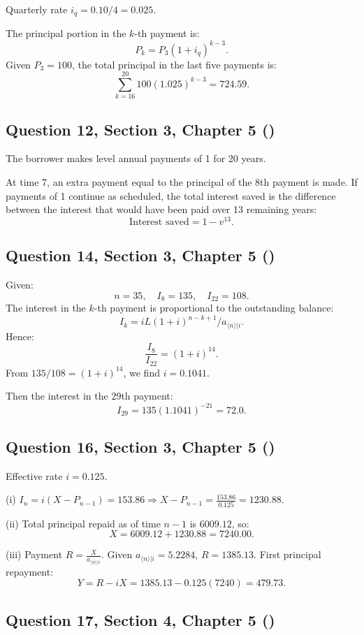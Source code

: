 \documentclass[12pt, a4paper]{article}
\newcommand{\angl}[1]{\langle #1 \rangle}
\begin{document}
Quarterly rate \( i_q = 0.10 / 4 = 0.025. \)

The principal portion in the \(k\)-th payment is:
\[
P_k = P_3 (1 + i_q)^{k-3}.
\]
Given \( P_3 = 100 \), the total principal in the last five payments is:
\[
\sum_{k=16}^{20} 100(1.025)^{k-3} = 724.59.
\]

\subsection*{Question 12, Section 3, Chapter 5  (\cite{toi3rd})}

The borrower makes level annual payments of 1 for 20 years.

At time 7, an extra payment equal to the principal of the 8th payment is made.  
If payments of 1 continue as scheduled, the total interest saved is the difference between the interest that would have been paid over 13 remaining years:
\[
\text{Interest saved} = 1 - v^{13}.
\]

\subsection*{Question 14, Section 3, Chapter 5  (\cite{toi3rd})}

Given:
\[
n = 35, \quad I_8 = 135, \quad I_{22} = 108.
\]
The interest in the \(k\)-th payment is proportional to the outstanding balance:
\[
I_k = i L (1 + i)^{n - k + 1} / a_{\angl{n}|i}.
\]
Hence:
\[
\frac{I_8}{I_{22}} = (1 + i)^{14}.
\]
From \(135 / 108 = (1 + i)^{14}\), we find \(i = 0.1041.\)

Then the interest in the 29th payment:
\[
I_{29} = 135(1.1041)^{-21} = 72.0.
\]

\subsection*{Question 16, Section 3, Chapter 5  (\cite{toi3rd})}

Effective rate \( i = 0.125 \).

(i) \( I_n = i(X - P_{n-1}) = 153.86 \Rightarrow X - P_{n-1} = \frac{153.86}{0.125} = 1230.88. \)

(ii) Total principal repaid as of time \(n-1\) is \( 6009.12 \), so:
\[
X = 6009.12 + 1230.88 = 7240.00.
\]

(iii) Payment \( R = \frac{X}{a_{\angl{n}|i}}. \)
Given \(a_{\angl{n}|i} = 5.2284\), \(R = 1385.13.\)
First principal repayment:
\[
Y = R - iX = 1385.13 - 0.125(7240) = 479.73.
\]

\subsection*{Question 17, Section 4, Chapter 5  (\cite{toi3rd})}
\end{document}
